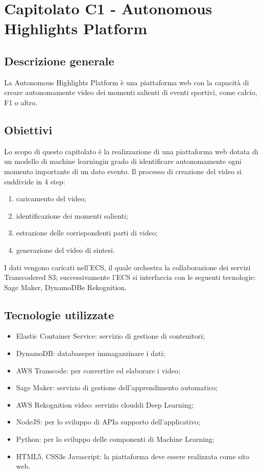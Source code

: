 \section{Capitolato C1 - Autonomous Highlights Platform}

\subsection{Descrizione generale}
La Autonomous Highlights Platform è una piattaforma web con la capacità di creare autonomamente video dei momenti salienti di eventi sportivi, come calcio, F1 o altro.

\subsection{Obiettivi}
Lo scopo di questo capitolato è la realizzazione di una piattaforma web dotata di un modello di machine learning\glo in grado di identificare autonomamente ogni momento importante di un dato evento. Il processo di creazione del video si suddivide in 4 step: \begin{enumerate}
\item caricamento del video;
\item identificazione dei momenti salienti;
\item estrazione delle corrispondenti parti di video;
\item generazione del video di sintesi.
\end{enumerate}
I dati vengono caricati nell’ECS\glo, il quale orchestra la collaborazione dei servizi Transcoder\glo ed S3\glo; successivamente l’ECS si interfaccia con le seguenti tecnologie: Sage Maker\glo, DynamoDB\glo e Rekognition\glo.

\subsection{Tecnologie utilizzate}
\begin{itemize}
\item Elastic Container Service: servizio di gestione di contenitori\glo;
\item DynamoDB: database\glo per immagazzinare i dati;
\item AWS Transcode: per convertire ed elaborare i video;
\item Sage Maker: servizio di gestione dell’apprendimento automatico\glo;
\item AWS Rekognition video: servizio cloud\glo di Deep Learning\glo;
\item NodeJS\glo: per lo sviluppo di API\glo a supporto dell’applicativo;
\item Python\glo: per lo sviluppo delle componenti di Machine Learning;
\item HTML5\glo, CSS3\glo e Javascript\glo: la piattaforma deve essere realizzata come sito web.
\end{itemize}


